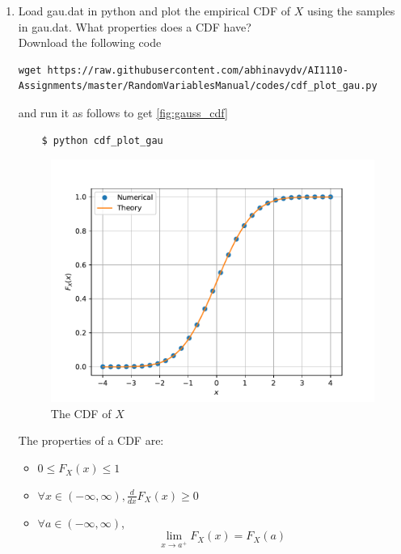 \documentclass[journal,12pt,twocolumn]{IEEEtran}
\renewcommand\thesection{\arabic{section}}
\begin{document}
\begin{enumerate}[label=\thesection.\arabic*
        ,ref=\thesection.\theenumi]
    \item
          Load gau.dat in python and plot the empirical CDF of $X$ using the samples in gau.dat. What properties does a CDF have?
          \\
          \solution  Download the following code
          \begin{lstlisting}
wget https://raw.githubusercontent.com/abhinavydv/AI1110-Assignments/master/RandomVariablesManual/codes/cdf_plot_gau.py
\end{lstlisting}
          and run it as follows to get \autoref{fig:gauss_cdf}
          \begin{lstlisting}
    $ python cdf_plot_gau
\end{lstlisting}
          \begin{figure}
              \centering
              \includegraphics[width=\columnwidth]{./figs/gauss_cdf}
              \caption{The CDF of $X$}
              \label{fig:gauss_cdf}
          \end{figure}
          The properties of a CDF are:
          \begin{itemize}
              \item $0 \le F_X(x) \le 1$
              \item $ \forall x \in (-\infty, \infty),  \frac{d}{dx}F_{X}(x) \ge 0$
              \item $\forall a \in (-\infty, \infty)$, \[\lim_{x \to a^+} F_{X}(x) = F_X(a)\]
          \end{itemize}


\end{enumerate}
\end{document}
